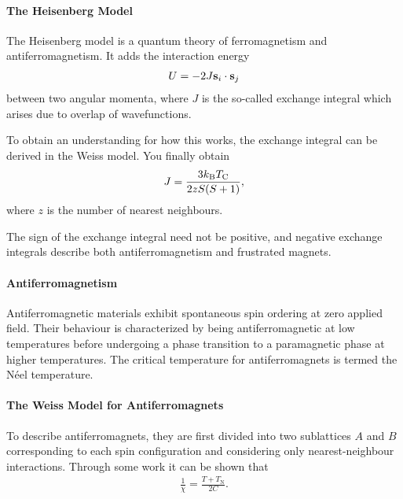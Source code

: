 \paragraph{The Heisenberg Model}
The Heisenberg model is a quantum theory of ferromagnetism and antiferromagnetism. It adds the interaction energy
\begin{align*}
	U = -2J\vb{s}_{i}\cdot\vb{s}_{j}
\end{align*}
between two angular momenta, where $J$ is the so-called exchange integral which arises due to overlap of wavefunctions.

To obtain an understanding for how this works, the exchange integral can be derived in the Weiss model. You finally obtain
\begin{align*}
		J = \frac{3k_{\text{B}} T_{\text{C}}}{2zS(S + 1)},
\end{align*}
where $z$ is the number of nearest neighbours.

The sign of the exchange integral need not be positive, and negative exchange integrals describe both antiferromagnetism and frustrated magnets.

\paragraph{Antiferromagnetism}
Antiferromagnetic materials exhibit spontaneous spin ordering at zero applied field. Their behaviour is characterized by being antiferromagnetic at low temperatures before undergoing a phase transition to a paramagnetic phase at higher temperatures. The critical temperature for antiferromagnets is termed the Néel temperature.

\paragraph{The Weiss Model for Antiferromagnets}
To describe antiferromagnets, they are first divided into two sublattices $A$ and $B$ corresponding to each spin configuration and considering only nearest-neighbour interactions. Through some work it can be shown that
\begin{align*}
	\frac{1}{\chi} = \frac{T + T_{\text{N}}}{2C}.
\end{align*}